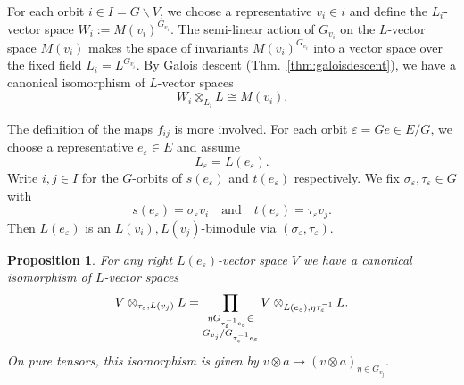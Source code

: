 \documentclass[a4paper,12pt,reqno]{amsart}
\theoremstyle{plain}
\newtheorem{proposition}[theorem]{Proposition}
\theoremstyle{remark}
\begin{document}
  \smallskip
  For each orbit $i \in I = G\backslash V$, we choose a representative $v_i \in i$ and define the $L_i$-vector space $W_i := M(v_i)^{G_{v_i}}$. The semi-linear action of $G_{v_i}$ on the $L$-vector space $M(v_i)$ makes the space of invariants $M(v_i)^{G_{v_i}}$ into a vector space over the fixed field $L_i = L^{G_{v_i}}$. By Galois descent (Thm.~\ref{thm:galoisdescent}), we have a canonical isomorphism of $L$-vector spaces
    \begin{equation}
      W_i\otimes_{L_i} L\cong M(v_i).
      \label{eq:WitoMvi}
    \end{equation}

    \smallskip
    The definition of the maps $f_{ij}$ is more involved. For each orbit $\varepsilon=Ge \in E/G$, we choose a representative $e_\varepsilon \in E$ and assume
    \[
    L_{\varepsilon}=L(e_\varepsilon).
    \]
    Write $i,j\in I$ for the $G$-orbits of $s(e_\varepsilon)$ and $t(e_\varepsilon)$ respectively. We fix $\sigma_\varepsilon,\tau_\varepsilon\in G$ with
    \begin{equation}
      s(e_\varepsilon)=\sigma_\varepsilon v_i\quad\text{and}\quad
      t(e_\varepsilon)=\tau_\varepsilon v_j.
      \label{eq:endsofedgetranslations}
    \end{equation}
    Then $L(e_\varepsilon)$ is an $L(v_i),L(v_j)$-bimodule via $(\sigma_\varepsilon,\tau_\varepsilon)$.

    \begin{proposition}
      For any right $L(e_\varepsilon)$-vector space $V$ we have a canonical isomorphism of $L$-vector spaces
    \begin{equation}
      V\otimes_{\tau_\varepsilon,L(v_j)}L
      =
      \prod_{\begin{subarray}c\eta G_{\tau_\varepsilon^{-1}e_\varepsilon}\in\\G_{v_j}/G_{\tau_\varepsilon^{-1}e_\varepsilon}\end{subarray}} V\otimes_{L(e_\varepsilon),\eta\tau_\varepsilon^{-1}}L.
      \label{eq:Leepsilondecomposition}
    \end{equation}
    On pure tensors, this isomorphism is given by
    \(
    v\otimes a\mapsto (v\otimes a)_{\eta\in G_{v_j}}.
    \)
    \end{proposition}
\end{document}
